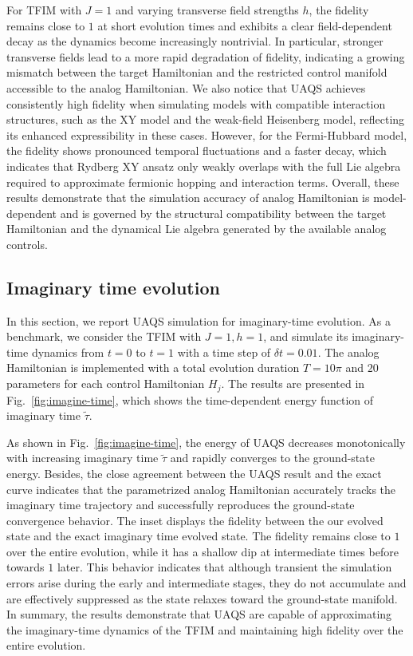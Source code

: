\documentclass[twocolumn,
pra,aps,superscriptaddress,showpacs,amsmath,amssymb]{revtex4-2}
\begin{document}
For TFIM with $J=1$ and varying transverse field strengths $h$, the fidelity remains close to $1$ at short evolution times and exhibits a clear field-dependent decay as the dynamics become increasingly nontrivial. In particular, stronger transverse fields lead to a more rapid degradation of fidelity, indicating a growing mismatch between the target Hamiltonian and the restricted control manifold accessible to the analog Hamiltonian. We also notice that UAQS achieves consistently high fidelity when simulating models with compatible interaction structures, such as the XY model and the weak-field Heisenberg model, reflecting its enhanced expressibility in these cases. However, for the Fermi-Hubbard model, the fidelity shows pronounced temporal fluctuations and a faster decay,
which indicates that Rydberg XY ansatz only weakly overlaps with the full Lie algebra required to approximate fermionic hopping and interaction terms. Overall, these results demonstrate that the simulation accuracy of analog Hamiltonian is model-dependent and is governed by the structural compatibility between the target Hamiltonian and the dynamical Lie algebra generated by the available analog controls. 

\subsection{Imaginary time evolution}
In this section, we report UAQS simulation for imaginary-time evolution. As a benchmark, we consider the TFIM with $J=1,h=1$, and simulate its imaginary-time dynamics from $t=0$ to $t=1$ with a time step of $\delta t = 0.01$. The analog Hamiltonian is implemented with a total evolution duration $T = 10\pi$ and $20$ parameters for each control Hamiltonian $H_j$. The results are presented in Fig.~\ref{fig:imagine-time}, which shows the time-dependent energy function of imaginary time $\tilde{\tau}$. 

As shown in Fig.~\ref{fig:imagine-time}, the energy of UAQS decreases monotonically with increasing imaginary time $\tilde{\tau}$ and rapidly converges to the ground-state energy. Besides, the close agreement between the UAQS result and the exact curve indicates that the parametrized analog Hamiltonian accurately tracks the imaginary time trajectory and successfully reproduces the ground-state convergence behavior. The inset displays the fidelity between the our evolved state and the exact imaginary time evolved state. The fidelity remains close to $1$ over the entire evolution, while it has a shallow dip at intermediate times before towards $1$ later. This behavior indicates that although transient the simulation errors arise during the early and intermediate stages, they do not accumulate and are effectively suppressed as the state relaxes toward the ground-state manifold.
In summary, the results demonstrate that UAQS are capable of approximating the imaginary-time dynamics of the TFIM and maintaining high fidelity over the entire evolution.
\end{document}
